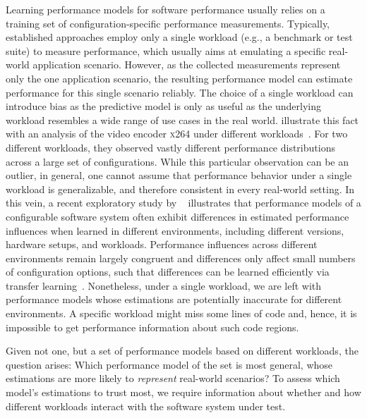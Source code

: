 Learning performance models for software performance usually relies on a training set of configuration-specific performance measurements. 
Typically, established approaches employ only a single workload (e.g., a benchmark or test suite) to measure performance, which usually aims at emulating a specific real-world application scenario. 
However, as the collected measurements represent only the one application scenario, the resulting performance model can  estimate performance for this single scenario reliably. 
The choice of a single workload can introduce bias as the predictive model is only as useful as the underlying workload resembles a wide range of use cases in the real world. 
\citeauthor{alves_sampling_2020} illustrate this fact with an analysis of the video encoder \textsc{x264} under different workloads~\cite{alves_sampling_2020}. 
For two different workloads, they observed vastly different performance distributions across a large set of configurations.
While this particular observation can be an outlier, in general, one cannot assume that performance behavior under a single workload is generalizable, and therefore consistent in every real-world setting.
In this vein, a recent exploratory study by \citeauthor{jamishidi_transfer_2017}~\cite{jamishidi_transfer_2017} illustrates that performance models of a configurable software system often exhibit differences in estimated performance influences when learned in different environments, including different versions, hardware setups, and workloads.
Performance  influences across different environments remain largely congruent and differences only affect small numbers of configuration options, such that differences can be learned efficiently via transfer learning~\cite{jamshidi_transfer_gp_2017,jamshidi_learning_2018}. 
Nonetheless, under a single workload, we are left with performance models whose estimations are potentially inaccurate for different environments. A specific workload might miss some lines of code and, hence, it is impossible to get performance information about such code regions.


Given not one, but a set of performance models based on different workloads, the question arises: Which performance model of the set is most general, whose estimations are more likely to \emph{represent} real-world scenarios? 
To assess which model's estimations to trust most, we require information about whether and how different workloads interact with the software system under test. 

